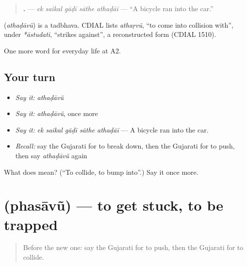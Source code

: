 \begin{quote}
\textbf{    .} — \emph{ek saikal gāḍī sāthe athaḍāī} — \textquotedblleft{}A bicycle ran into the car.\textquotedblright{}
\end{quote}

\begin{cousinweb}
\textbf{} (\emph{athaḍāvũ}) is a tadbhava. CDIAL lists \emph{athaṛvũ}, \textquotedblleft{}to come into collision with\textquotedblright{}, under \emph{*āstudati}, \textquotedblleft{}strikes against\textquotedblright{}, a reconstructed form (CDIAL 1510).
\end{cousinweb}

\begin{grammarlens}[title={What you've built}]
One more word for everyday life at A2.
\end{grammarlens}

\subsection*{Your turn}
\begin{itemize}
\raggedright
  \item \emph{Say it:} \emph{athaḍāvũ}
  \item \emph{Say it:} \emph{athaḍāvũ}, once more
  \item \emph{Say it:} \emph{ek saikal gāḍī sāthe athaḍāī} — A bicycle ran into the car.
  \item \emph{Recall:} say the Gujarati for to break down, then the Gujarati for to push, then say \emph{athaḍāvũ} again
\end{itemize}

\begin{tcolorbox}[breakable,colback=teal!4,colframe=teal!35!black,title={Before you move on}]
What does  mean? (\textquotedblleft{}To collide, to bump into\textquotedblright{}.) Say it once more.
\end{tcolorbox}
\section[\texorpdfstring{\gu{ફસાવું} (phasāvũ)}{ફસાવું (phasāvũ)}]{ (phasāvũ) — to get stuck, to be trapped}

\label{lesson:GU-C209-phasavu}



\begin{quote}
Before the new one: say the Gujarati for to push, then the Gujarati for to collide.
\end{quote}

